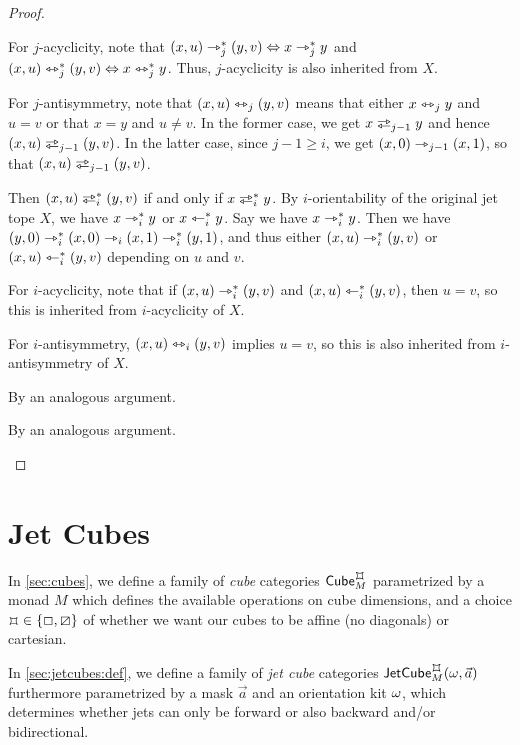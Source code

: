 \documentclass[a4paper]{memoir}
\begin{document}
\begin{proof}
\begin{description}
\begin{description}
			For $j$-acyclicity, note that $(x, u) \rightarrowtriangle_j^* (y, v) \Leftrightarrow x \rightarrowtriangle_j^* y$ and $(x, u) \leftrightarrowtriangle_j^* (y, v) \Leftrightarrow x \leftrightarrowtriangle_j^* y$. Thus, $j$-acyclicity is also inherited from $X$.
			
			For $j$-antisymmetry, note that $(x, u) \leftrightarrowtriangle_j (y, v)$ means that either $x \leftrightarrowtriangle_j y$ and $u = v$ or that $x = y$ and $u \neq v$.
			In the former case, we get $x \infrajet_{j-1} y$ and hence $(x, u) \infrajet_{j-1} (y, v)$.
			In the latter case, since $j-1 \geq i$, we get $(x, 0) \rightarrowtriangle_{j-1} (x, 1)$, so that $(x, u) \infrajet_{j-1} (y, v)$.
			\item[$j = i$] Then $(x, u) \infrajet_i^* (y, v)$ if and only if $x \infrajet_i^* y$.
			By $i$-orientability of the original jet tope $X$, we have $x \rightarrowtriangle_i^* y$ or $x \leftarrowtriangle_i^* y$. Say we have $x \rightarrowtriangle_i^* y$.
			Then we have $(y, 0) \rightarrowtriangle_i^* (x, 0) \rightarrowtriangle_i (x, 1) \rightarrowtriangle_i^* (y, 1)$, and thus either $(x, u) \rightarrowtriangle_i^* (y, v)$ or $(x, u) \leftarrowtriangle_i^* (y, v)$ depending on $u$ and $v$.
			
			For $i$-acyclicity, note that if $(x, u) \rightarrowtriangle_i^* (y, v)$ and $(x, u) \leftarrowtriangle_i^* (y, v)$, then $u = v$, so this is inherited from $i$-acyclicity of $X$.
			
			For $i$-antisymmetry, $(x, u) \leftrightarrowtriangle_i (y, v)$ implies $u = v$, so this is also inherited from $i$-antisymme\-try of $X$.
		\end{description}
		\item[\framebox{$\loch \multip \rival{\tej_i\pmry}$}] By an analogous argument.
		\item[\framebox{$\loch \multip \rival{\edge_i\pmrn}$}] By an analogous argument. \qedhere
	\end{description}
\end{proof}

\section{Jet Cubes} \label{sec:jetcubes}
In \cref{sec:cubes}, we define a family of \emph{cube} categories $\cubecat_M^\mycubex$ parametrized by a monad $M$ which defines the available operations on cube dimensions, and a choice $\mycubex \in \accol{\affine, \cartes}$ of whether we want our cubes to be affine (no diagonals) or cartesian.

In \cref{sec:jetcubes:def}, we define a family of \emph{jet cube} categories $\jetcube{\myorix}{\mycubex}{M}{\vec a}$ furthermore parametrized by a mask $\vec a$ and an orientation kit $\omega$, which determines whether jets can only be forward or also backward and/or bidirectional.
\end{document}
